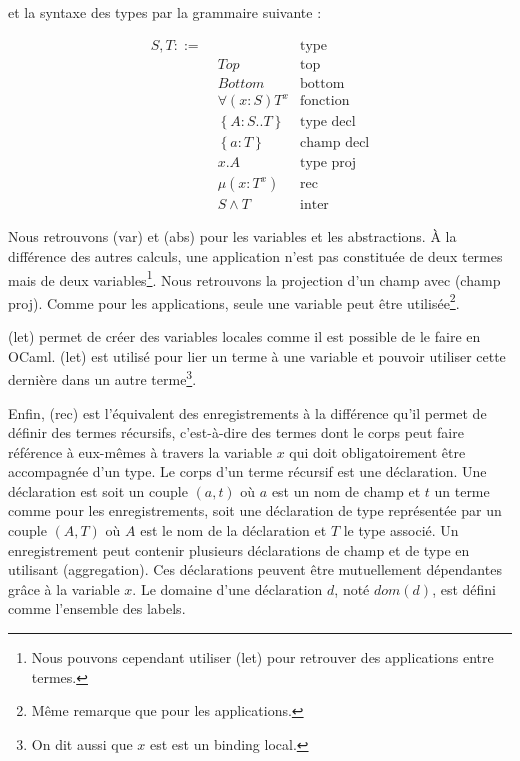 et la syntaxe des types par la grammaire suivante :

\begin{align*}
  S, T ::= & \, & \text{type} \\
           & \; Top & \text{top} \\
           & \; Bottom & \text{bottom} \\
           & \; \forall(x : S) T^{x} & \text{fonction} \\
           & \; \left\{ A : S .. T \right\} & \text{type decl} \\
           & \; \left\{ a : T \right\} & \text{champ decl} \\
           & \; x.A & \text{type proj} \\
           & \; \mu(x : T^{x}) & \text{rec} \\
           & \; S \wedge T & \text{inter}
\end{align*}

Nous retrouvons (var) et (abs) pour les variables et les
abstractions.
À la différence des autres calculs, une application n'est pas constituée de deux
termes mais de deux variables\footnote{Nous pouvons cependant utiliser (let)
  pour retrouver des applications entre termes.}. Nous retrouvons la projection d'un champ avec
(champ proj). Comme pour les applications, seule une variable peut être
utilisée\footnote{Même remarque que pour les applications.}.

(let) permet de créer des variables locales comme il est possible de le faire en OCaml.
(let) est utilisé pour lier un terme à une variable et pouvoir utiliser cette
dernière dans un autre terme\footnote{On dit aussi que $x$ est est un binding
  local.}.

Enfin, (rec) est l'équivalent des enregistrements à la différence qu'il permet
de définir des termes récursifs, c'est-à-dire des termes
dont le corps peut faire référence à eux-mêmes à travers la variable $x$ qui
doit obligatoirement être accompagnée d'un type. Le
corps d'un terme récursif est une déclaration. Une déclaration est soit un
couple $(a, t)$ où $a$ est un nom de champ et $t$ un terme comme pour les
enregistrements, soit une déclaration de type représentée par un couple $(A,
T)$ où $A$ est le nom de la déclaration et $T$ le type associé. Un enregistrement peut contenir plusieurs déclarations de champ et
de type en utilisant (aggregation). Ces déclarations peuvent être mutuellement
dépendantes grâce à la variable $x$.
Le domaine d'une déclaration $d$, noté $dom(d)$, est défini comme l'ensemble des
labels.

